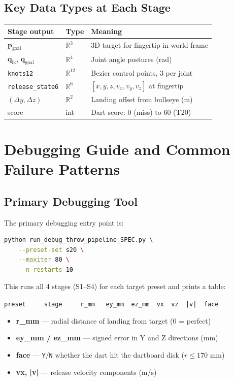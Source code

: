 \documentclass[11pt,letterpaper]{article}
\newcommand{\bq}{\bm{q}}
\begin{document}
\subsection{Key Data Types at Each Stage}

\begin{center}
\begin{tabular}{lll}
\toprule
Stage output & Type & Meaning \\
\midrule
$\bm{p}_{\text{goal}}$ & $\mathbb{R}^3$ & 3D target for fingertip in world frame \\
$\bq_{\text{ik}}$, $\bq_{\text{goal}}$ & $\mathbb{R}^4$ & Joint angle postures (rad) \\
\texttt{knots12} & $\mathbb{R}^{12}$ & Bezier control points, 3 per joint \\
\texttt{release\_state6} & $\mathbb{R}^6$ & $[x,y,z,v_x,v_y,v_z]$ at fingertip \\
$(\Delta y, \Delta z)$ & $\mathbb{R}^2$ & Landing offset from bullseye (m) \\
score & int & Dart score: 0 (miss) to 60 (T20) \\
\bottomrule
\end{tabular}
\end{center}

\section{Debugging Guide and Common Failure Patterns}

\subsection{Primary Debugging Tool}

The primary debugging entry point is:
\begin{lstlisting}[language=bash, numbers=none]
python run_debug_throw_pipeline_SPEC.py \
    --preset-set s20 \
    --maxiter 80 \
    --n-restarts 10
\end{lstlisting}
This runs all 4 stages (S1--S4) for each target preset and prints a table:
\begin{center}
\texttt{preset\ \ \ \ \ stage\ \ \ \ \ r\_mm\ \ \ ey\_mm\ \ ez\_mm\ \ vx\ \ vz\ \ |v|\ \ face}
\end{center}
\begin{itemize}[nosep]
  \item \textbf{r\_mm} — radial distance of landing from target (0 = perfect)
  \item \textbf{ey\_mm / ez\_mm} — signed error in Y and Z directions (mm)
  \item \textbf{face} — \texttt{Y}/\texttt{N} whether the dart hit the dartboard disk ($r \leq 170$ mm)
  \item \textbf{vx, |v|} — release velocity components (m/s)
\end{itemize}
\end{document}
